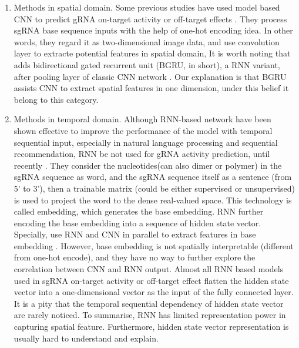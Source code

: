 \documentclass{bioinfo}
\begin{document}
\begin{enumerate}
    \item Methods in spatial domain. 
    Some previous studies have used model based CNN to predict gRNA on-target activity or off-target effects \citep{lin2018off-target,kim2018deep,chuai2018deepcrispr}. 
    They process sgRNA base sequence inputs with the help of one-hot encoding idea. 
    In other words, they regard it as two-dimensional image data, and use convolution layer to extracte potential features in spatial domain, 
    It is worth noting that \citeauthor{zhang2020c-rnncrispr:} adds bidirectional gated recurrent unit (BGRU, in short), a RNN variant, after pooling layer of classic CNN network \citep{zhang2020c-rnncrispr:}. 
    Our explanation is that BGRU assists CNN to extract spatial features in one dimension, under this belief it belong to this category. 
    \item Methods in temporal domain. 
    Although RNN-based network have been shown effective to improve the performance of the model with temporal sequential input, especially in natural language processing and sequential recommendation\citep{huang2018improving}, 
    RNN be not used for gRNA activity prediction, until recently \citep{wang2019optimized,liu2020deep,Liu2019}. 
    They consider the nucleotides(can also dimer or polymer) in the sgRNA sequence as word, and the sgRNA sequence itself as a sentence (from 5' to 3'), then a trainable matrix (could be either supervised or unsupervised) is used to project the word to the dense real-valued space. 
    This technology is called embedding, which generates the base embedding. RNN further encoding the base embedding into a sequence of hidden state vector. 
    Specially, \citeauthor{Liu2019} use RNN and CNN in parallel to extract features in base embedding \citep{Liu2019}. 
    However, base embedding is not spatially interpretable (different from one-hot encode), and they have no way to further explore the correlation between CNN and RNN output. 
    Almost all RNN based models used in sgRNA on-target activity or off-target effect flatten the hidden state vector into a one-dimensional vector as the input of the fully connected layer. 
    It is a pity that the temporal sequential dependency of hidden state vector are rarely noticed. 
    To summarise, RNN has limited representation power in capturing spatial feature. Furthermore, hidden state vector representation is usually hard to understand and explain.
\end{enumerate}
\end{document}
